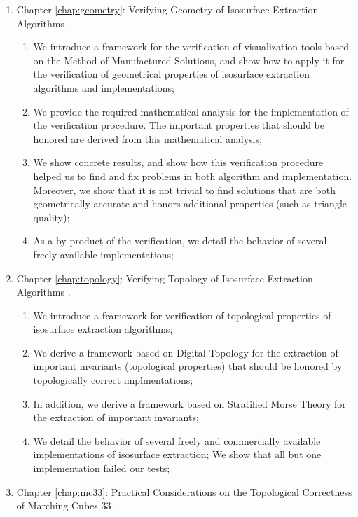 \begin{enumerate}[noitemsep,topsep=0pt,parsep=0pt,partopsep=0pt]
\item Chapter \ref{chap:geometry}: Verifying Geometry of Isosurface Extraction Algorithms \cite{etiene:tvcg:2009}.
\begin{enumerate}
\setlength{\itemsep}{0pt}
\setlength{\topsep}{0pt}
\item We introduce a framework for the verification of visualization tools based on the Method of Manufactured Solutions, and show how to apply it for the verification of geometrical properties of isosurface extraction algorithms and implementations;
\item We provide the required mathematical analysis for the implementation of the verification procedure. The important properties that should be honored are derived from this mathematical analysis;
\item We show concrete results, and show how this verification procedure helped us to find and fix problems in both algorithm and implementation. Moreover, we show that it is not trivial to find solutions that are both geometrically accurate and honors additional properties (such as triangle quality);
\item As a by-product of the verification, we detail the behavior of several freely available implementations;
\end{enumerate}
\item Chapter \ref{chap:topology}: Verifying Topology of Isosurface Extraction Algorithms \cite{Etiene:2012:TVI:2197070.2197097}.
\begin{enumerate}
\setlength{\itemsep}{0pt}
\setlength{\topsep}{0pt}
\item We introduce a framework for verification of topological properties of isosurface extraction algorithms;
\item We derive a framework based on Digital Topology for the extraction of important invariants (topological properties) that should be honored by topologically correct implmentations;
\item In addition, we derive a framework based on Stratified Morse Theory for the extraction of important invariants;
\item We detail the behavior of several freely and commercially available implementations of isosurface extraction; We show that all but one implementation failed our tests;
\end{enumerate}
\item Chapter \ref{chap:mc33}: Practical Considerations on the Topological Correctness of Marching Cubes 33 \cite{Lis2013}.

\end{enumerate}
